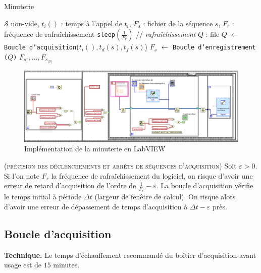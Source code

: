 \documentclass[twocolumn,pre,floats,aps,amsmath,amssymb]{revtex4}
\newenvironment{remark}[1][Remarque.]{\begin{trivlist}
\item[\hskip \labelsep {\bfseries #1}]}{\end{trivlist}}
\begin{document}
\begin{algorithm}[h]
\caption{Minuterie}
\label{algo_timer}
\begin{algorithmic}[1]
  \REQUIRE $\mathcal{S}$ non-vide, $t_i()$ : temps \`a l'appel de $t_i$, $F_s$ : fichier de la s\'equence $s$, $F_r$ : fr\'equence de rafra\^ichissement
  \STATE \texttt{sleep}$(\frac{1}{F_r})$ \hfill // \textit{rafra\^ichissement}
  \ENDWHILE
  \STATE $Q$ : file
  \STATE $Q$ $\leftarrow$ \texttt{Boucle d'acquisition}($t_i(), t_d (s), t_f (s)$)
  \STATE $F_s$ $\leftarrow$ \texttt{Boucle d'enregistrement ($Q$)}
  \ENDFOR
  \RETURN $F_{s_1}, \dots, F_{s_{\left | \mathcal{S} \right |}}$
\end{algorithmic}
\end{algorithm}

\begin{figure}[]
  \includegraphics[width=17.5cm]{pictures/minuterie.png}
\caption{Impl\'ementation de la minuterie en LabVIEW}
\label{fig:algo_timer_labview}
\end{figure}

\begin{remark}
  \textsc{(pr\'ecision des d\'eclenchements et arr\^ets de s\'equences d'acquisition)}
  Soit $\varepsilon > 0$.
  Si l'on note $F_r$ la fr\'equence de rafra\^ichissement du logiciel, on risque d'avoir une erreur de retard d'acquisition de l'ordre de $\frac{1}{F_r} - \varepsilon$. La boucle d'acquisition v\'erifie le temps initial \`a p\'eriode $\Delta t$ (largeur de fen\^etre de calcul). On risque alors d'avoir une erreur de d\'epassement de temps d'acquisition \`a $\Delta t - \varepsilon$ pr\`es. 
\end{remark}

\subsection{Boucle d'acquisition}

\noindent
\textbf{Technique.} Le temps d'\'echauffement recommand\'e du bo\^itier d'acquisition avant usage est de $15$ minutes\cite{NI_6353_datasheet}.
\end{document}
